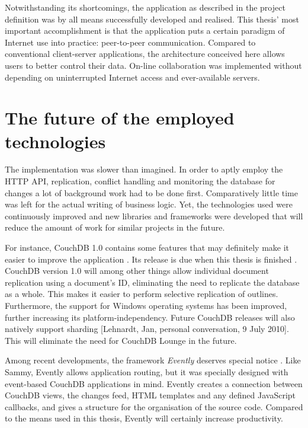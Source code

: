 Notwithstanding its shortcomings, the application as described in the project definition was by all means successfully developed and realised. This thesis' most important accomplishment is that the application puts a certain paradigm of Internet use into practice: peer-to-peer communication. Compared to conventional client-server applications, the architecture conceived here allows users to better control their data. On-line collaboration was implemented without depending on uninterrupted Internet access and ever-available servers.


\section{The future of the employed technologies}

The implementation was slower than imagined. In order to aptly employ the HTTP API, replication, conflict handling and monitoring the database for changes a lot of background work had to be done first. Comparatively little time was left for the actual writing of business logic. Yet, the technologies used were continuously improved and new libraries and frameworks were developed that will reduce the amount of work for similar projects in the future.

For instance, CouchDB 1.0 contains some features that may definitely make it easier to improve the application \cite{couch:whatsnew}. Its release is due when this thesis is finished \cite{couch:release1.0}. CouchDB version 1.0 will among other things allow individual document replication using a document's ID, eliminating the need to replicate the database as a whole. This makes it easier to perform selective replication of outlines. Furthermore, the support for Windows operating systems has been improved, further increasing its platform-independency. Future CouchDB releases will also natively support sharding [Lehnardt, Jan, personal conversation, 9 July 2010]. This will eliminate the need for CouchDB Lounge in the future.

Among recent developments, the framework \textit{Evently} deserves special notice \cite{evently:website}. Like Sammy, Evently allows application routing, but it was specially designed with event-based CouchDB applications in mind. Evently creates a connection between CouchDB views, the changes feed, HTML templates and any defined JavaScript callbacks, and gives a structure for the organisation of the source code. Compared to the means used in this thesis, Evently will certainly increase productivity.


